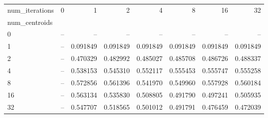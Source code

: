 \begin{tabular}{lrrrrrrr}
\toprule
num\_iterations &  0  &        1  &        2  &        4  &        8  &        16 &        32 \\
num\_centroids &     &           &           &           &           &           &           \\
\midrule
0             & -- &       -- &       -- &       -- &       -- &       -- &       -- \\
1             & -- &  0.091849 &  0.091849 &  0.091849 &  0.091849 &  0.091849 &  0.091849 \\
2             & -- &  0.470329 &  0.482992 &  0.485027 &  0.485708 &  0.486726 &  0.488337 \\
4             & -- &  0.538153 &  0.545310 &  0.552117 &  0.555453 &  0.555747 &  0.555258 \\
8             & -- &  0.572856 &  0.561396 &  0.541970 &  0.549960 &  0.557928 &  0.560184 \\
16            & -- &  0.563134 &  0.535830 &  0.508805 &  0.491790 &  0.497241 &  0.505935 \\
32            & -- &  0.547707 &  0.518565 &  0.501012 &  0.491791 &  0.476459 &  0.472039 \\
\bottomrule
\end{tabular}
